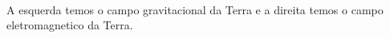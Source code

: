 \documentclass{article}
\begin{document}
\begin{enumerate}
\begin{figure}[!ht]
\begin{subfigure}{\textwidth}
            \label{fig:imagem2}
        \end{subfigure}
        \label{fig:exemplo_duas_imagens} 
    \end{figure} \\
    A esquerda temos o campo gravitacional da Terra e a direita temos o campo eletromagnetico da Terra.
    
\end{enumerate}
\end{document}
